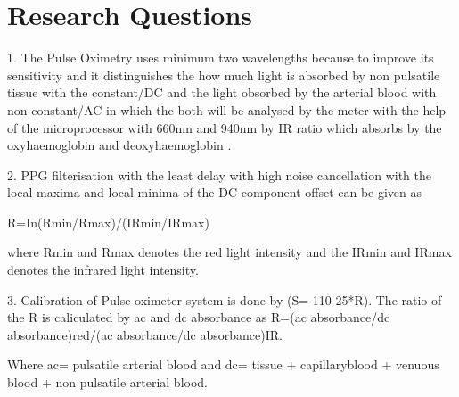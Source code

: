 





\section{Research Questions}

1. The Pulse Oximetry uses minimum two wavelengths because to improve its sensitivity and it distinguishes the how much light is absorbed by non pulsatile tissue with the constant/DC and the light obsorbed by the arterial blood with non constant/AC in which the both will be analysed by the meter with the help of the microprocessor with 660nm and 940nm by IR ratio which absorbs by the oxyhaemoglobin and deoxyhaemoglobin \cite[p.~349578348574]{webster1997design}.

2. PPG filterisation with the least delay with high noise cancellation with the local maxima and local minima of the DC component offset can be given as \cite{webster1997design}
\begin{center}
R=In(Rmin/Rmax)/(IRmin/IRmax)
\end{center}
where Rmin and Rmax denotes the red light intensity and the IRmin and IRmax denotes the infrared light intensity.

3. Calibration of Pulse oximeter system is done by (S= 110-25*R). The ratio of the R is caliculated by ac and dc absorbance as R=(ac absorbance/dc absorbance)red/(ac absorbance/dc absorbance)IR.

Where ac= pulsatile arterial blood and dc= tissue + capillaryblood + venuous blood + non pulsatile arterial blood.




